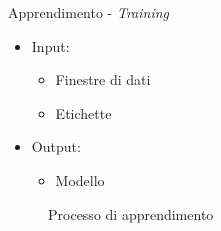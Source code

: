 \begin{tframe}{Apprendimento - \textit{Training}}

    \begin{minipage}{0.45\textwidth}
        
        \begin{itemize}
            \item Input:
                \begin{itemize}
                    \item Finestre di dati
                    \item Etichette
                \end{itemize}
        \end{itemize}

    \end{minipage}%
    \hfill
    \begin{minipage}{0.55\textwidth}
        
        \begin{itemize}
            \item Output:
                \begin{itemize}
                    \item Modello
                \end{itemize}
        \end{itemize}
        \vspace{3mm}
        
    \end{minipage}%

    \vspace{7mm}

    \begin{figure}
        
        \caption*{Processo di apprendimento}
    \end{figure}

\end{tframe}